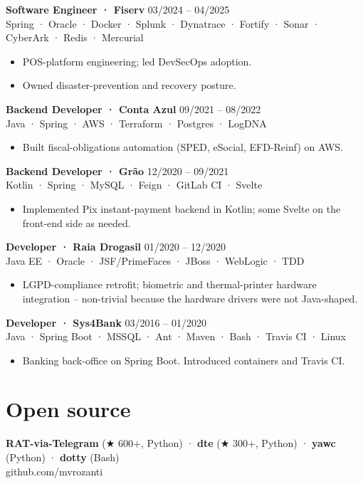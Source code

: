 \documentclass[10pt,a4paper]{article}
\begin{document}
\noindent\textbf{Software Engineer · Fiserv} \hfill 03/2024 -- 04/2025\\
{\small\color{muted}Spring · Oracle · Docker · Splunk · Dynatrace · Fortify · Sonar · CyberArk · Redis · Mercurial}
\begin{itemize}
\item POS-platform engineering; led DevSecOps adoption.
\item Owned disaster-prevention and recovery posture.
\end{itemize}

\noindent\textbf{Backend Developer · Conta Azul} \hfill 09/2021 -- 08/2022\\
{\small\color{muted}Java · Spring · AWS · Terraform · Postgres · LogDNA}
\begin{itemize}
\item Built fiscal-obligations automation (SPED, eSocial, EFD-Reinf) on AWS.
\end{itemize}

\noindent\textbf{Backend Developer · Grão} \hfill 12/2020 -- 09/2021\\
{\small\color{muted}Kotlin · Spring · MySQL · Feign · GitLab CI · Svelte}
\begin{itemize}
\item Implemented Pix instant-payment backend in Kotlin; some Svelte on the front-end side as needed.
\end{itemize}

\noindent\textbf{Developer · Raia Drogasil} \hfill 01/2020 -- 12/2020\\
{\small\color{muted}Java EE · Oracle · JSF/PrimeFaces · JBoss · WebLogic · TDD}
\begin{itemize}
\item LGPD-compliance retrofit; biometric and thermal-printer hardware integration -- non-trivial because the hardware drivers were not Java-shaped.
\end{itemize}

\noindent\textbf{Developer · Sys4Bank} \hfill 03/2016 -- 01/2020\\
{\small\color{muted}Java · Spring Boot · MSSQL · Ant · Maven · Bash · Travis CI · Linux}
\begin{itemize}
\item Banking back-office on Spring Boot. Introduced containers and Travis CI.
\end{itemize}

\section{Open source}
\noindent
\textbf{RAT-via-Telegram} (★ 600+, Python) · \textbf{dte} (★ 300+, Python) · \textbf{yawc} (Python) · \textbf{dotty} (Bash)\\
{\small\color{muted}github.com/mvrozanti}
\end{document}
